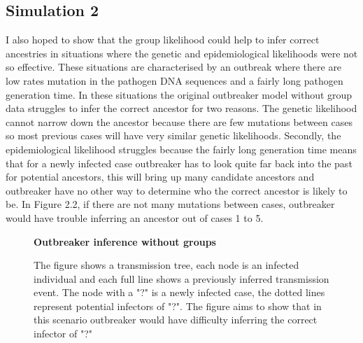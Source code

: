 \documentclass[11pt,a4paper]{report}
\begin{document}
\subsection{Simulation 2}
I also hoped to show that the group likelihood could help to infer correct ancestries in situations where the genetic and epidemiological likelihoods were not so effective. These situations are characterised by an outbreak where there are low rates mutation in the pathogen DNA sequences and a fairly long pathogen generation time. In these situations the original outbreaker model without group data struggles to infer the correct ancestor for two reasons. The genetic likelihood cannot narrow down the ancestor because there are few mutations between cases so most previous cases will have very similar genetic likelihoods. Secondly, the epidemiological likelihood struggles because the fairly long generation time means that for a newly infected case outbreaker has to look quite far back into the past for potential ancestors, this will bring up many candidate ancestors and outbreaker have no other way to determine who the correct ancestor is likely to be. In Figure 2.2, if there are not many mutations between cases, outbreaker would have trouble inferring an ancestor out of cases 1 to 5.
\\
\begin{figure}[h!]
\centering
{} \newline
{\bf Outbreaker inference without groups}
\caption{The figure shows a transmission tree, each node is an infected individual and each full line shows a previously inferred transmission event. The node with a "?" is a newly infected case, the dotted lines represent potential infectors of "?". The figure aims to show that in this scenario outbreaker would have difficulty inferring the correct infector of "?"}
\end{figure}
\end{document}
